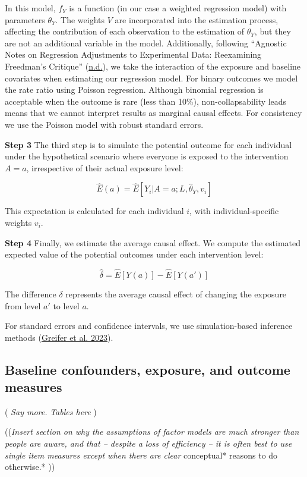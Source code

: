 \documentclass[
  singlecolumn]{report}
\begin{document}
In this model, \(f_Y\) is a function (in our case a weighted regression
model) with parameters \(θ_Y\). The weights \(V\) are incorporated into
the estimation process, affecting the contribution of each observation
to the estimation of \(θ_Y\), but they are not an additional variable in
the model. Additionally, following {``Agnostic Notes on Regression
Adjustments to Experimental Data: Reexamining Freedman{'}s Critique''}
(\protect\hyperlink{ref-agnostic}{n.d.}), we take the interaction of the
exposure and baseline covariates when estimating our regression model.
For binary outcomes we model the rate ratio using Poisson regression.
Although binomial regression is acceptable when the outcome is rare
(less than 10\%), non-collapsability leads means that we cannot
interpret results as marginal causal effects. For consistency we use the
Poisson model with robust standard errors.

\textbf{Step 3} The third step is to simulate the potential outcome for
each individual under the hypothetical scenario where everyone is
exposed to the intervention \(A=a\), irrespective of their actual
exposure level:

\[\hat{E}(a) = \hat{E}[Y_i|A=a; L,\hat{\theta}_Y, v_i]\]

This expectation is calculated for each individual \(i\), with
individual-specific weights \(v_i\).

\textbf{Step 4} Finally, we estimate the average causal effect. We
compute the estimated expected value of the potential outcomes under
each intervention level:

\[\hat{\delta} = \hat{E}[Y(a)] - \hat{E}[Y(a')]\]

The difference \(\delta\) represents the average causal effect of
changing the exposure from level \(a'\) to level \(a\).

For standard errors and confidence intervals, we use simulation-based
inference methods (\protect\hyperlink{ref-greifer2023}{Greifer et al.
2023}).

\hypertarget{baseline-confounders-exposure-and-outcome-measures}{%
\subsection{Baseline confounders, exposure, and outcome
measures}\label{baseline-confounders-exposure-and-outcome-measures}}

( \emph{Say more.} \emph{Tables here} )

((\emph{Insert section on why the assumptions of factor models are much
stronger than people are aware, and that -- despite a loss of efficiency
-- it is often best to use single item measures except when there are
clear} conceptual* reasons to do otherwise.* ))
\end{document}
